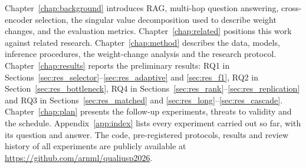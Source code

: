 Chapter~\ref{chap:background} introduces RAG, multi-hop question answering, cross-encoder selection, the singular value decomposition used to describe weight changes, and the evaluation metrics. Chapter~\ref{chap:related} positions this work against related research. Chapter~\ref{chap:method} describes the data, models, inference procedures, the weight-change analysis and the research protocol. Chapter~\ref{chap:results} reports the preliminary results: RQ1 in Sections~\ref{sec:res_selector}--\ref{sec:res_adaptive} and \ref{sec:res_f1}, RQ2 in Section~\ref{sec:res_bottleneck}, RQ4 in Sections~\ref{sec:res_rank}--\ref{sec:res_replication} and RQ3 in Sections~\ref{sec:res_matched} and \ref{sec:res_long}--\ref{sec:res_cascade}. Chapter~\ref{chap:plan} presents the follow-up experiments, threats to validity and the schedule. Appendix~\ref{app:index} lists every experiment carried out so far, with its question and answer. The code, pre-registered protocols, results and review history of all experiments are publicly available at \url{https://github.com/arnml/qualiusp2026}.
